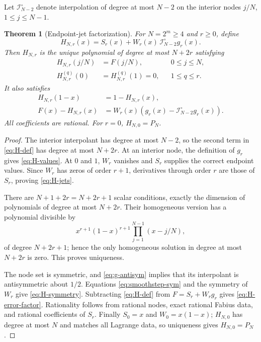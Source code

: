 \documentclass[11pt,oneside]{article}
\newtheorem{theorem}{Theorem}[section]
\theoremstyle{definition}
\theoremstyle{remark}
\newcommand{\Lag}{\mathcal I}
\begin{document}
Let $\Lag_{N-2}^{\circ}$ denote interpolation of degree at most $N-2$ on the interior nodes $j/N$, $1\le j\le N-1$.

\begin{theorem}[Endpoint-jet factorization]
\label{thm:jet-factorization}
For $N=2^m\ge4$ and $r\ge0$, define
\begin{equation}
 H_{N,r}(x)=S_r(x)+W_r(x)\,\Lag_{N-2}^{\circ}g_r(x).
 \label{eq:H-def}
\end{equation}
Then $H_{N,r}$ is the unique polynomial of degree at most $N+2r$ satisfying
\begin{align}
 H_{N,r}(j/N)&=F(j/N),&&0\le j\le N,\label{eq:H-values}\\
 H_{N,r}^{(q)}(0)&=H_{N,r}^{(q)}(1)=0,&&1\le q\le r.\label{eq:H-jets}
\end{align}
It also satisfies
\begin{align}
 H_{N,r}(1-x)&=1-H_{N,r}(x),\label{eq:H-symmetry}\\
 F(x)-H_{N,r}(x)&=W_r(x)\left(g_r(x)-\Lag_{N-2}^{\circ}g_r(x)\right).
 \label{eq:H-error-factor}
\end{align}
All coefficients are rational.  For $r=0$, $H_{N,0}=P_N$.
\end{theorem}

\begin{proof}
The interior interpolant has degree at most $N-2$, so the second term in \eqref{eq:H-def} has degree at most $N+2r$.  At an interior node, the definition of $g_r$ gives \eqref{eq:H-values}.  At $0$ and $1$, $W_r$ vanishes and $S_r$ supplies the correct endpoint values.  Since $W_r$ has zeros of order $r+1$, derivatives through order $r$ are those of $S_r$, proving \eqref{eq:H-jets}.

There are $N+1+2r=N+2r+1$ scalar conditions, exactly the dimension of polynomials of degree at most $N+2r$.  Their homogeneous version has a polynomial divisible by
\[
 x^{r+1}(1-x)^{r+1}\prod_{j=1}^{N-1}(x-j/N),
\]
of degree $N+2r+1$; hence the only homogeneous solution in degree at most $N+2r$ is zero.  This proves uniqueness.

The node set is symmetric, and \eqref{eq:g-antisym} implies that its interpolant is antisymmetric about $1/2$.  Equations \eqref{eq:smoothstep-sym} and the symmetry of $W_r$ give \eqref{eq:H-symmetry}.  Subtracting \eqref{eq:H-def} from $F=S_r+W_rg_r$ gives \eqref{eq:H-error-factor}.  Rationality follows from rational nodes, exact rational Fabius data, and rational coefficients of $S_r$.  Finally $S_0=x$ and $W_0=x(1-x)$; $H_{N,0}$ has degree at most $N$ and matches all Lagrange data, so uniqueness gives $H_{N,0}=P_N$.
\end{proof}
\end{document}
